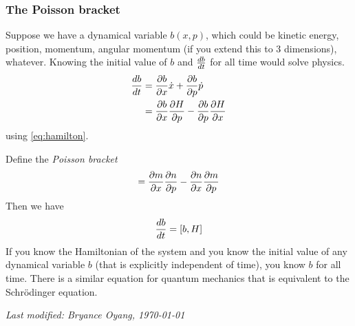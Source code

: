 \documentclass[12pt, oneside, letterpaper, fleqn]{article}
\begin{document}
\subsubsection{The Poisson bracket}
Suppose we have a dynamical variable $b(x,p)$, which could be kinetic
energy, position, momentum, angular momentum (if you extend this to 3
dimensions), whatever. Knowing the initial value of $b$ and $\frac{d b}{dt}$
for all time would solve physics.
\begin{align*}
\frac{d b}{dt} &= \frac{\partial b}{\partial x}\dot{x} + \frac{\partial b}{\partial p}\dot{p}\\
&= \frac{\partial b}{\partial x}\frac{\partial H}{\partial p} - \frac{\partial b}{\partial p}\frac{\partial H}{\partial x}
\end{align*}
using \eqref{eq:hamilton}.

Define the \emph{Poisson bracket}
\begin{align}
[m, n] = \pdx{m}\pd{n}{p} - \pdx{n}\pd{m}{p}
\end{align}
Then we have
\begin{align}\label{eq:classical_eom}
\frac{d b}{dt} = [b, H]
\end{align}
If you know the Hamiltonian of the system and you know the initial value
of any dynamical variable $b$ (that is explicitly independent of time),
you know $b$ for all time. There is a similar equation for quantum
mechanics that is equivalent to the Schr\"odinger equation.

\hfill \emph{Last modified: Bryance Oyang, \today}
\end{document}
